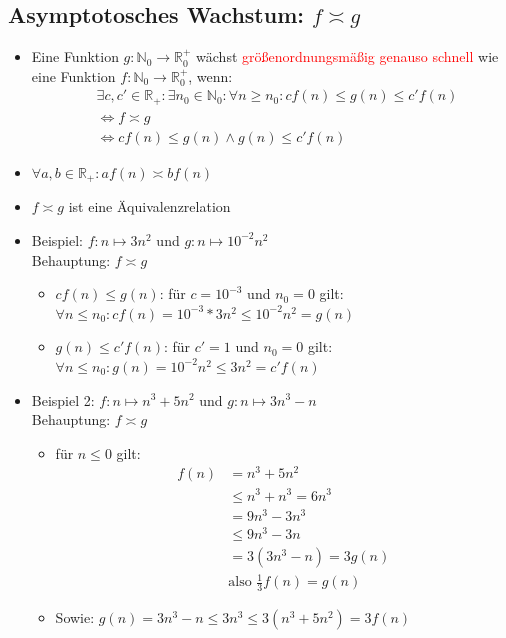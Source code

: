 \documentclass[a4paper,portrait]{scrartcl}
\begin{document}
\subsection{Asymptotosches Wachstum: $f \asymp g $}
\begin{itemize}
\item Eine Funktion $ g: \mathbb{N}_{0} \rightarrow \mathbb{R}_{0}^{+} $ wächst \textcolor{red}{größenordnungsmäßig genauso schnell} wie eine Funktion $ f: \mathbb{N}_{0} \rightarrow \mathbb{R}_{0}^{+} $, wenn:
\begin{align*}
&\exists c,c' \in \mathbb{R}_{+}: \exists n_{0} \in \mathbb{N}_{0}: \forall n \geq n_{0}: cf(n) \leq g(n) \leq c'f(n) \\
&\Leftrightarrow f \asymp g \\
&\Leftrightarrow cf(n) \leq g(n) \wedge g(n) \leq c'f(n)
\end{align*}
\item $ \forall a,b \in \mathbb{R}_{+}: af(n) \asymp bf(n) $
\item $f \asymp g $ ist eine Äquivalenzrelation
\item Beispiel: $f: n \mapsto 3n^{2}$ und $ g: n \mapsto 10^{-2}n^{2} $ \\
Behauptung: $f \asymp g $
\begin{itemize}
  \item $cf(n) \leq g(n)$: für $ c = 10^{-3} $ und $ n_{0} = 0 $ gilt: \\
  $ \forall n \leq n_{0}: cf(n) = 10^{-3}*3n^{2} \leq 10^{-2}n^{2} = g(n) $ 
  \item $g(n) \leq c'f(n)$: für $ c' = 1 $ und $ n_{0} = 0 $ gilt: \\
  $ \forall n \leq n_{0}: g(n) = 10^{-2}n^{2} \leq 3n^{2} = c'f(n) $
\end{itemize}
  \item Beispiel 2: $f: n \mapsto n^{3}+5n^{2}$ und $ g: n \mapsto 3n^{3}-n $ \\
Behauptung: $f \asymp g $
\begin{itemize}
  \item für $ n \leq 0 $ gilt:
  \begin{align*}
    f(n) &= n^3+5n^2 \\
    &\leq n^3+n^3 = 6n^3 \\
    &= 9n^3-3n^3 \\
    &\leq 9n^3-3n \\
    &= 3(3n^3-n) = 3g(n) \\
    &\text{also }\frac{1}{3}f(n) = g(n)
  \end{align*}
  \item Sowie: $ g(n) = 3n^3 -n \leq 3n^3 \leq 3(n^3+5n^2) = 3f(n) $
\end{itemize}
\end{itemize}
\end{document}
